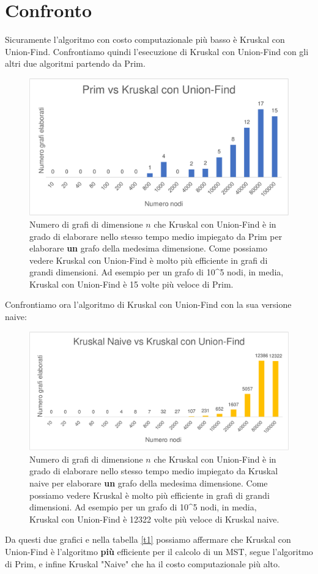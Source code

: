 \section{Confronto}
Sicuramente l'algoritmo con costo computazionale più basso è Kruskal con Union-Find.
Confrontiamo quindi l'esecuzione di Kruskal con Union-Find con gli altri due algoritmi partendo da Prim. 
\begin{figure}[H]
\centering
\includegraphics[scale=0.5]{grafici/primvskruskaluf.pdf}
\caption{Numero di grafi di dimensione $n$ che Kruskal con Union-Find è in grado di elaborare nello stesso tempo medio impiegato da Prim per elaborare \textbf{un} grafo  della medesima dimensione. Come possiamo vedere Kruskal con Union-Find è molto più efficiente in grafi di grandi dimensioni. Ad esempio per un grafo di 10\^{}5 nodi, in media, Kruskal con Union-Find è 15 volte più veloce di Prim.
}
\end{figure}
Confrontiamo ora l'algoritmo di Kruskal con Union-Find con la sua versione naive:
\begin{figure}[H]
\centering
\includegraphics[scale=0.5]{grafici/kruskalvskruskaluf.pdf}
\caption{Numero di grafi di dimensione $n$ che Kruskal con Union-Find è in grado di elaborare nello stesso tempo medio impiegato da Kruskal naive per elaborare \textbf{un} grafo della medesima dimensione. Come possiamo vedere Kruskal è molto più efficiente in grafi di grandi dimensioni. Ad esempio per un grafo di 10\^{}5 nodi, in media, Kruskal con Union-Find è 12322 volte più veloce di Kruskal naive.}
\end{figure}
Da questi due grafici e nella tabella \ref{t1} possiamo affermare che Kruskal con Union-Find è l'algoritmo \textbf{più} efficiente per il calcolo di un MST, segue l'algoritmo di Prim, e infine Kruskal "Naive" che ha il costo computazionale più alto.
